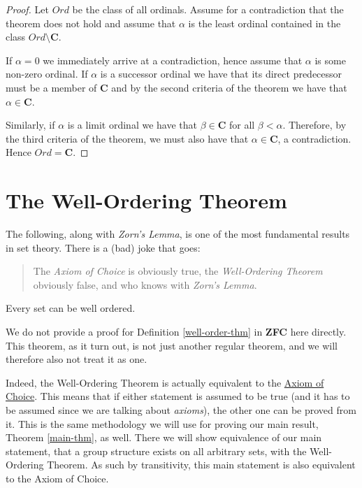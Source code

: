 \documentclass[../../main.tex]{subfiles}
\begin{document}
\begin{proof}
    Let $\mathit{Ord}$ be the class of all ordinals.
    Assume for a contradiction that the theorem does not hold and assume that $\alpha$ is the least ordinal contained in the class $\mathit{Ord} \setminus \mathbf{C}$.
    
    If $\alpha = 0$ we immediately arrive at a contradiction, hence assume that $\alpha$ is some non-zero ordinal.
    If $\alpha$ is a successor ordinal we have that its direct predecessor must be a member of $\mathbf{C}$ and by the second criteria of the theorem we have that $\alpha \in \mathbf{C}$.
    
    Similarly, if $\alpha$ is a limit ordinal we have that $\beta \in \mathbf{C}$ for all $\beta < \alpha$.
    Therefore, by the third criteria of the theorem, we must also have that $\alpha \in \mathbf{C}$, a contradiction.
    Hence $\mathit{Ord} = \mathbf{C}$.
\end{proof}

\section{The Well-Ordering Theorem}
The following, along with \textit{Zorn's Lemma}, is one of the most fundamental results in set theory.
There is a (bad) joke that goes:
\begin{quote} %
    The \textit{Axiom of Choice} is obviously true, the \textit{Well-Ordering Theorem} obviously false, 
    and who knows with \textit{Zorn's Lemma}.
\end{quote}

\begin{definition}\cite[Theorem 15, p.39]{Jec78}\label{well-order-thm}
    \newline Every set can be well ordered. 
\end{definition}

We do not provide a proof for Definition \ref{well-order-thm} in \textbf{ZFC} here directly.
This theorem, as it turn out, is not just another regular theorem, and we will therefore also not treat it as one.

Indeed, the Well-Ordering Theorem is actually equivalent to the \hyperref[choice-axiom]{Axiom of Choice}.
This means that if either statement is assumed to be true (and it has to be assumed since we are talking about \textit{axioms}),
the other one can be proved from it.
This is the same methodology we will use for proving our main result, Theorem \ref{main-thm}, as well.
There we will show equivalence of our main statement, that a group structure exists on all arbitrary sets, with the Well-Ordering Theorem.
As such by transitivity, this main statement is also equivalent to the Axiom of Choice.
\end{document}
